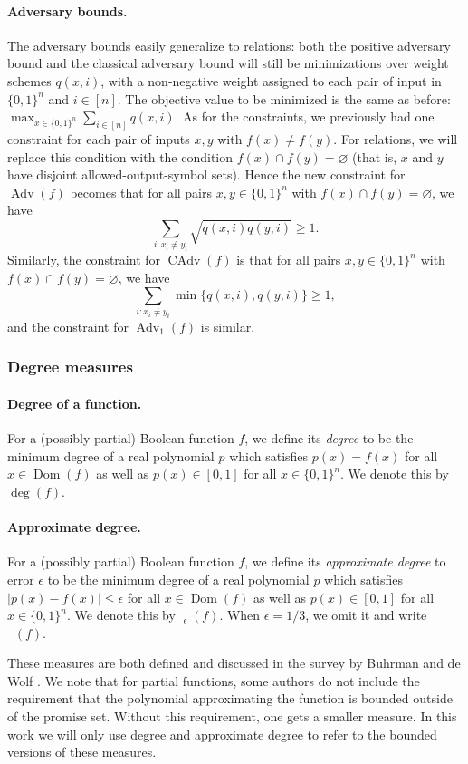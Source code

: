 \documentclass[10pt,a4paper]{article}
\theoremstyle{definition}
\DeclareMathOperator{\Dom}{Dom}
\newcommand{\B}{\{0,1\}}
\renewcommand{\>}{\rangle}
\newcommand{\<}{\langle}
\DeclareMathOperator{\Adv}{Adv}
\DeclareMathOperator{\CAdv}{CAdv}
\DeclareMathOperator{\adeg}{\widetilde{\deg}}
\begin{document}
\paragraph{Adversary bounds.}
The adversary bounds easily generalize to relations:
both the positive adversary bound and the classical adversary
bound will still be minimizations over weight schemes
$q(x,i)$, with a non-negative weight assigned to each pair of
input in $\B^n$ and $i\in[n]$. The objective value to be
minimized is the same as before:
$\max_{x\in\B^n}\sum_{i\in[n]} q(x,i)$.
As for the constraints, we previously had one constraint
for each pair of inputs $x,y$ with $f(x)\ne f(y)$.
For relations, we will replace this condition with the condition
$f(x)\cap f(y)=\varnothing$ (that is, $x$ and $y$ have
disjoint allowed-output-symbol sets). Hence the new constraint
for $\Adv(f)$ becomes that for all pairs $x,y\in\B^n$
with $f(x)\cap f(y)=\varnothing$, we have
\[\sum_{i:x_i\ne y_i}\sqrt{q(x,i)q(y,i)}\ge 1.\]
Similarly, the constraint for $\CAdv(f)$ is that for all pairs
$x,y\in\B^n$ with $f(x)\cap f(y)=\varnothing$, we have
\[\sum_{i:x_i\ne y_i}\min\{q(x,i),q(y,i)\}\ge 1,\]
and the constraint for $\Adv_1(f)$ is similar.



\subsubsection{Degree measures}

\paragraph{Degree of a function.} For a
(possibly partial) Boolean function $f$, we define
its \emph{degree} to be the minimum degree of a real
polynomial $p$ which satisfies $p(x)=f(x)$
for all $x\in\Dom(f)$ as well as $p(x)\in[0,1]$ for
all $x\in\B^n$. We denote this by $\deg(f)$.

\paragraph{Approximate degree.} For a (possibly partial)
Boolean function $f$, we define its \emph{approximate degree}
to error $\epsilon$
to be the minimum degree of a real polynomial $p$
which satisfies $|p(x)-f(x)|\le \epsilon$
for all $x\in\Dom(f)$
as well as $p(x)\in[0,1]$ for all $x\in\B^n$.
We denote this by $\adeg_\epsilon(f)$.
When $\epsilon=1/3$, we omit it and write $\adeg(f)$.

These measures are both defined and discussed in the
survey by Buhrman and de Wolf \cite{BdW02}.
We note that for partial functions, some authors do not
include the requirement that the polynomial approximating
the function is bounded outside of the promise set.
Without this requirement, one gets a smaller measure.
In this work we will only use degree and approximate
degree to refer to the bounded versions of these measures.
\end{document}
